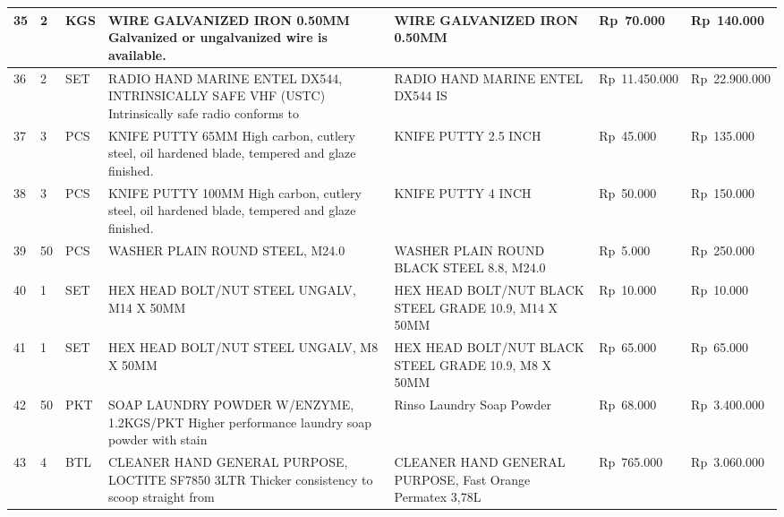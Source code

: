 \documentclass[9pt,a4paper,landscape]{article}
\begin{document}
\begin{longtable}{|C{0.6cm}|C{0.6cm}|C{0.8cm}|L{8.0cm}|L{9.5cm}|R{2.5cm}|R{2.5cm}|}
35 & 2 & KGS &
  WIRE GALVANIZED IRON 0.50MM\newline
  Galvanized or ungalvanized wire is available. &
  WIRE GALVANIZED IRON 0.50MM &
  Rp~70.000 & Rp~140.000 \\
\hline

36 & 2 & SET &
  RADIO HAND MARINE ENTEL DX544,\newline
  INTRINSICALLY SAFE VHF (USTC)\newline
  Intrinsically safe radio conforms to &
  RADIO HAND MARINE ENTEL DX544 IS &
  Rp~11.450.000 & Rp~22.900.000 \\
\hline

37 & 3 & PCS &
  KNIFE PUTTY 65MM\newline
  High carbon, cutlery steel, oil hardened blade,\newline
  tempered and glaze finished. &
  KNIFE PUTTY 2.5 INCH &
  Rp~45.000 & Rp~135.000 \\
\hline

38 & 3 & PCS &
  KNIFE PUTTY 100MM\newline
  High carbon, cutlery steel, oil hardened blade,\newline
  tempered and glaze finished. &
  KNIFE PUTTY 4 INCH &
  Rp~50.000 & Rp~150.000 \\
\hline

39 & 50 & PCS &
  WASHER PLAIN ROUND STEEL, M24.0 &
  WASHER PLAIN ROUND BLACK STEEL 8.8, M24.0 &
  Rp~5.000 & Rp~250.000 \\
\hline

40 & 1 & SET &
  HEX HEAD BOLT/NUT STEEL UNGALV, M14 X 50MM &
  HEX HEAD BOLT/NUT BLACK STEEL GRADE 10.9, M14 X 50MM &
  Rp~10.000 & Rp~10.000 \\
\hline

41 & 1 & SET &
  HEX HEAD BOLT/NUT STEEL UNGALV, M8 X 50MM &
  HEX HEAD BOLT/NUT BLACK STEEL GRADE 10.9, M8 X 50MM &
  Rp~65.000 & Rp~65.000 \\
\hline

42 & 50 & PKT &
  SOAP LAUNDRY POWDER W/ENZYME, 1.2KGS/PKT\newline
  Higher performance laundry soap powder with stain &
  Rinso Laundry Soap Powder &
  Rp~68.000 & Rp~3.400.000 \\
\hline

43 & 4 & BTL &
  CLEANER HAND GENERAL PURPOSE, LOCTITE SF7850\newline
  3LTR Thicker consistency to scoop straight from &
  CLEANER HAND GENERAL PURPOSE, Fast Orange Permatex 3,78L &
  Rp~765.000 & Rp~3.060.000 \\
\hline


\end{longtable}
\end{document}
